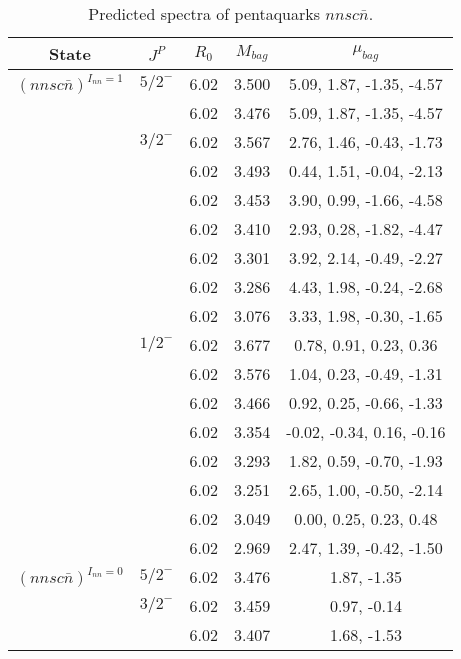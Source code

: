 \documentclass[prd,twocolumn,floatfix,nofootinbib]{revtex4}
\begin{document}
\renewcommand{\tabcolsep}{0.5cm}
\renewcommand{\arraystretch}{1.2}
\begin{table*}[!htbp]
    \caption{Predicted spectra of pentaquarks $nnsc\bar{n}$.}
    \begin{tabular}{ccccc}
        \hline\hline
        {\rm State} &$J^{P}$ &$R_{0}$ &$M_{bag}$ &$\mu_{bag}$ \\ \hline
        ${(nnsc\bar{n})}^{I_{nn}=1}$
            &${5/2}^{-}$    &6.02   &3.500  &5.09, 1.87, -1.35, -4.57 \\
            &               &6.02   &3.476  &5.09, 1.87, -1.35, -4.57 \\
            &${3/2}^{-}$    &6.02   &3.567  &2.76, 1.46, -0.43, -1.73 \\
            &               &6.02   &3.493  &0.44, 1.51, -0.04, -2.13 \\
            &               &6.02   &3.453  &3.90, 0.99, -1.66, -4.58 \\
            &               &6.02   &3.410  &2.93, 0.28, -1.82, -4.47 \\
            &               &6.02   &3.301  &3.92, 2.14, -0.49, -2.27 \\
            &               &6.02   &3.286  &4.43, 1.98, -0.24, -2.68 \\
            &               &6.02   &3.076  &3.33, 1.98, -0.30, -1.65 \\
            &${1/2}^{-}$    &6.02   &3.677  &0.78, 0.91, 0.23, 0.36 \\
            &               &6.02   &3.576  &1.04, 0.23, -0.49, -1.31 \\
            &               &6.02   &3.466  &0.92, 0.25, -0.66, -1.33 \\
            &               &6.02   &3.354  &-0.02, -0.34, 0.16, -0.16 \\
            &               &6.02   &3.293  &1.82, 0.59, -0.70, -1.93 \\
            &               &6.02   &3.251  &2.65, 1.00, -0.50, -2.14 \\
            &               &6.02   &3.049  &0.00, 0.25, 0.23, 0.48 \\
            &               &6.02   &2.969  &2.47, 1.39, -0.42, -1.50 \\
        ${(nnsc\bar{n})}^{I_{nn}=0}$
            &${5/2}^{-}$    &6.02   &3.476  &1.87, -1.35 \\
            &${3/2}^{-}$    &6.02   &3.459  &0.97, -0.14 \\
            &               &6.02   &3.407  &1.68, -1.53 \\

\end{tabular}
\end{table*}
\end{document}
